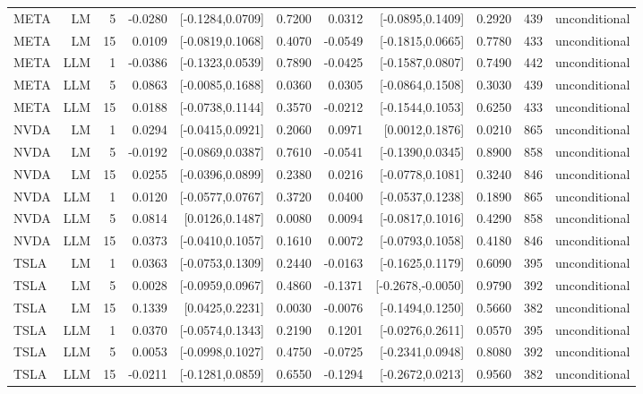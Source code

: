 \begin{table}[htbp]
\begin{tabular}{lrrrrrrrrrr}
META & LM & 5 & -0.0280 & [-0.1284,0.0709] & 0.7200 & 0.0312 & [-0.0895,0.1409] & 0.2920 & 439 & unconditional \\
META & LM & 15 & 0.0109 & [-0.0819,0.1068] & 0.4070 & -0.0549 & [-0.1815,0.0665] & 0.7780 & 433 & unconditional \\
META & LLM & 1 & -0.0386 & [-0.1323,0.0539] & 0.7890 & -0.0425 & [-0.1587,0.0807] & 0.7490 & 442 & unconditional \\
META & LLM & 5 & 0.0863 & [-0.0085,0.1688] & 0.0360 & 0.0305 & [-0.0864,0.1508] & 0.3030 & 439 & unconditional \\
META & LLM & 15 & 0.0188 & [-0.0738,0.1144] & 0.3570 & -0.0212 & [-0.1544,0.1053] & 0.6250 & 433 & unconditional \\
NVDA & LM & 1 & 0.0294 & [-0.0415,0.0921] & 0.2060 & 0.0971 & [0.0012,0.1876] & 0.0210 & 865 & unconditional \\
NVDA & LM & 5 & -0.0192 & [-0.0869,0.0387] & 0.7610 & -0.0541 & [-0.1390,0.0345] & 0.8900 & 858 & unconditional \\
NVDA & LM & 15 & 0.0255 & [-0.0396,0.0899] & 0.2380 & 0.0216 & [-0.0778,0.1081] & 0.3240 & 846 & unconditional \\
NVDA & LLM & 1 & 0.0120 & [-0.0577,0.0767] & 0.3720 & 0.0400 & [-0.0537,0.1238] & 0.1890 & 865 & unconditional \\
NVDA & LLM & 5 & 0.0814 & [0.0126,0.1487] & 0.0080 & 0.0094 & [-0.0817,0.1016] & 0.4290 & 858 & unconditional \\
NVDA & LLM & 15 & 0.0373 & [-0.0410,0.1057] & 0.1610 & 0.0072 & [-0.0793,0.1058] & 0.4180 & 846 & unconditional \\
TSLA & LM & 1 & 0.0363 & [-0.0753,0.1309] & 0.2440 & -0.0163 & [-0.1625,0.1179] & 0.6090 & 395 & unconditional \\
TSLA & LM & 5 & 0.0028 & [-0.0959,0.0967] & 0.4860 & -0.1371 & [-0.2678,-0.0050] & 0.9790 & 392 & unconditional \\
TSLA & LM & 15 & 0.1339 & [0.0425,0.2231] & 0.0030 & -0.0076 & [-0.1494,0.1250] & 0.5660 & 382 & unconditional \\
TSLA & LLM & 1 & 0.0370 & [-0.0574,0.1343] & 0.2190 & 0.1201 & [-0.0276,0.2611] & 0.0570 & 395 & unconditional \\
TSLA & LLM & 5 & 0.0053 & [-0.0998,0.1027] & 0.4750 & -0.0725 & [-0.2341,0.0948] & 0.8080 & 392 & unconditional \\
TSLA & LLM & 15 & -0.0211 & [-0.1281,0.0859] & 0.6550 & -0.1294 & [-0.2672,0.0213] & 0.9560 & 382 & unconditional \\

\end{tabular}
\end{table}

